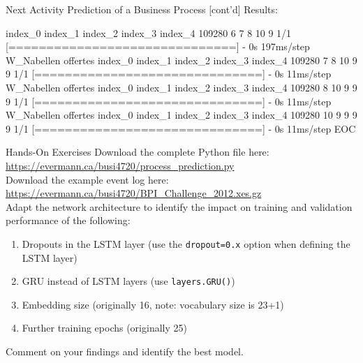 \documentclass[ignorenonframetext,xcolor=x11names]{beamer}
\begin{document}
\begin{frame}[fragile]{Next Activity Prediction of a Business Process \small [cont'd]}
Results:
\begin{textcode}
       index_0  index_1  index_2  index_3  index_4
109280        6        7        8       10        9
1/1 [==============================] - 0s 197ms/step
W_Nabellen offertes
        index_0  index_1  index_2  index_3  index_4
109280        7        8       10        9        9
1/1 [==============================] - 0s 11ms/step
W_Nabellen offertes
        index_0  index_1  index_2  index_3  index_4
109280        8       10        9        9        9
1/1 [==============================] - 0s 11ms/step
W_Nabellen offertes
        index_0  index_1  index_2  index_3  index_4
109280       10        9        9        9        9
1/1 [==============================] - 0s 11ms/step
EOC
\end{textcode}
\end{frame}



\begin{frame}{Hands-On Exercises}
\small
Download the complete Python file here: \url{https://evermann.ca/busi4720/process_prediction.py} \\
Download the example event log here: \url{https://evermann.ca/busi4720/BPI_Challenge_2012.xes.gz} \\

Adapt the network architecture to identify the impact on training and validation performance of the following:
   \begin{enumerate}
      \item Dropouts in the LSTM layer (use the \texttt{dropout=0.x} option when defining the LSTM layer)
      \item GRU instead of LSTM layers (use \texttt{layers.GRU()})
      \item Embedding size (originally 16, note: vocabulary size is 23+1)
      \item Further training epochs (originally 25)
   \end{enumerate}
Comment on your findings and identify the best model. \\
\end{frame}
\end{document}
